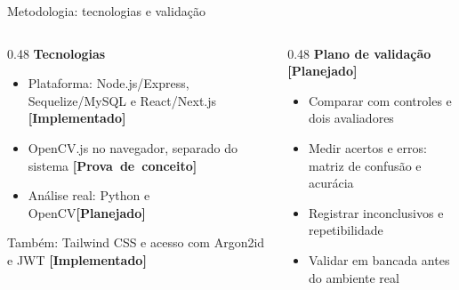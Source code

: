 \documentclass[aspectratio=169]{beamer}
\newcommand{\estado}[2]{\mbox{\scriptsize\textcolor{#1}{\textbf{[#2]}}}}
\newcommand{\implementado}{\estado{azulComplementar}{Implementado}}
\newcommand{\provaconceito}{\estado{vermelhoPrincipal}{Prova de conceito}}
\newcommand{\planejado}{\estado{black!70}{Planejado}}
\begin{document}
\begin{frame}[t]{Metodologia: tecnologias e validação}
  \begin{columns}[T]
    \begin{column}{0.48\textwidth}
      \textbf{Tecnologias}
      \begin{itemize}
        \item Plataforma: Node.js/Express, Sequelize/MySQL e React/Next.js \implementado
        \item OpenCV.js no navegador, separado do sistema \provaconceito
        \item Análise real: Python e OpenCV\footnotemark[1] \planejado
      \end{itemize}
      {\small Também: Tailwind CSS e acesso com Argon2id e JWT \implementado}
    \end{column}
    \begin{column}{0.48\textwidth}
      \textbf{Plano de validação} \planejado
      \begin{itemize}
        \item Comparar com controles e dois avaliadores
        \item Medir acertos e erros: matriz de confusão e acurácia\footnotemark[2]
        \item Registrar inconclusivos e repetibilidade
        \item Validar em bancada antes do ambiente real
      \end{itemize}
    \end{column}
  \end{columns}
\end{frame}

\end{document}
